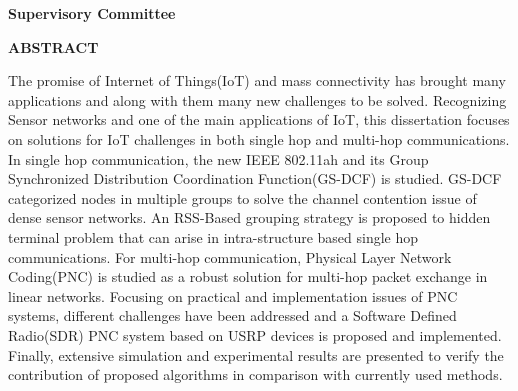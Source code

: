 \newpage
{}

\noindent \textbf{Supervisory Committee}
\tpbreak
\panel

\begin{center}
\textbf{ABSTRACT}
\end{center}

The promise of Internet of Things(IoT) and mass connectivity has brought many applications and along with them many new challenges to be solved. Recognizing Sensor networks and one of the main applications of IoT, this dissertation focuses on solutions for IoT challenges in both single hop and multi-hop communications. In single hop communication, the new IEEE 802.11ah and its Group Synchronized Distribution Coordination Function(GS-DCF) is studied. GS-DCF categorized nodes in multiple groups to solve the channel contention issue of dense sensor networks. An RSS-Based grouping strategy is proposed to hidden terminal problem that can arise in intra-structure based single hop communications. For multi-hop communication, Physical Layer Network Coding(PNC) is studied as a robust solution for multi-hop packet exchange in linear networks. Focusing on practical and implementation issues of PNC systems, different challenges have been addressed and a Software Defined Radio(SDR) PNC system based on USRP devices is proposed and implemented. Finally, extensive simulation and experimental results are presented to verify the contribution of proposed algorithms in comparison with currently used methods.